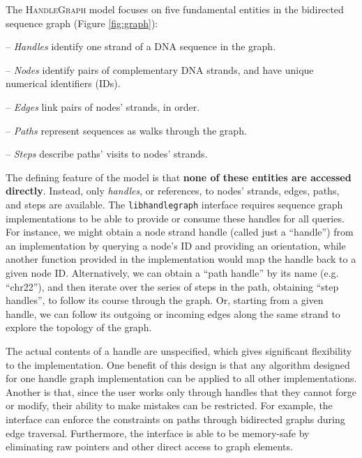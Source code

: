\documentclass{article}
\begin{document}
The \textsc{HandleGraph} model focuses on five fundamental entities in the bidirected sequence graph (Figure \ref{fig:graph}):

-- \emph{Handles} identify one strand of a DNA sequence in the graph.

-- \emph{Nodes} identify pairs of complementary DNA strands, and have unique numerical identifiers (IDs).

-- \emph{Edges} link pairs of nodes' strands, in order.

-- \emph{Paths} represent sequences as walks through the graph.

-- \emph{Steps} describe paths' visits to nodes' strands.

The defining feature of the model is that \textbf{none of these entities are accessed directly}.
Instead, only \emph{handles}, or references, to nodes' strands, edges, paths, and steps are available.
The \texttt{libhandlegraph} interface requires sequence graph implementations to be able to provide or consume these handles for all queries.
For instance, we might obtain a node strand handle (called just a ``handle'') from an implementation by querying a node's ID and providing an orientation, while another function provided in the implementation would map the handle back to a given node ID.
Alternatively, we can obtain a ``path handle'' by its name (e.g. ``chr22''), and then iterate over the series of steps in the path, obtaining ``step handles'', to follow its course through the graph.
Or, starting from a given handle, we can follow its outgoing or incoming edges along the same strand to explore the topology of the graph.


The actual contents of a handle are unspecified, which gives significant flexibility to the implementation.
One benefit of this design is that any algorithm designed for one handle graph implementation can be applied to all other implementations.
Another is that, since the user works only through handles that they cannot forge or modify, their ability to make mistakes can be restricted.
For example, the interface can enforce the constraints on paths through bidirected graphs during edge traversal.
Furthermore, the interface is able to be memory-safe by eliminating raw pointers and other direct access to graph elements.
\end{document}
